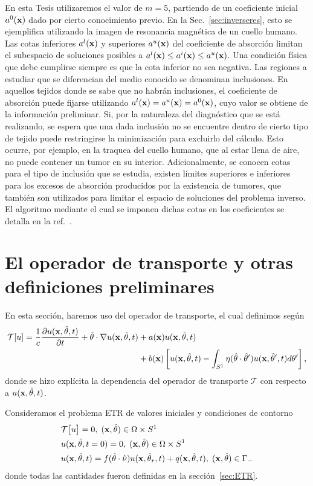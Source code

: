 En esta Tesis utilizaremos el valor 
de $m=5$, partiendo de un coeficiente inicial $a^0(\mathbf{x})$ dado 
por cierto conocimiento previo. En la Sec.~\ref{sec:inverseres}, esto se ejemplifica utilizando la imagen 
de resonancia magnética de un cuello humano.
Las cotas inferiores $a^l(\mathbf{x})$ y superiores $a^u(\mathbf{x})$ del coeficiente de absorción 
limitan el subespacio de soluciones posibles a $a^l(\mathbf{x})\leq a^i(\mathbf{x}) \leq a^u(\mathbf{x})$. 
Una condición física que debe cumplirse siempre es que la cota inferior 
no sea negativa. Las regiones a estudiar que se diferencian del medio 
conocido se denominan inclusiones. En aquellos tejidos donde se sabe 
que no habrán inclusiones, el coeficiente de absorción 
puede fijarse utilizando $a^l(\mathbf{x}) = a^u(\mathbf{x})=a^0(\mathbf{x})$, cuyo valor se obtiene de la información preliminar. Si, por la naturaleza del diagnóstico que se está realizando, 
se espera que una dada inclusión no 
se encuentre dentro de cierto tipo de tejido 
puede restringirse la minimización para excluirlo 
del cálculo. 
Esto ocurre, por ejemplo, en la traquea del cuello humano, que 
al estar llena de aire, no puede contener 
un tumor en su interior.
Adicionalmente, se conocen cotas para el tipo de inclusión 
que se estudia, \eg existen límites superiores e inferiores para los 
excesos de absorción producidos por la existencia de tumores, 
que también son utilizados para limitar el espacio de soluciones 
del problema inverso. 
El algoritmo mediante el cual se imponen dichas cotas en los coeficientes 
se detalla en la ref.~\cite{Byrd1995}. 

\section{El operador de transporte y otras definiciones preliminares}
En esta sección, haremos uso del operador de transporte, el cual definimos
según
\begin{equation}
\begin{split}
\mathcal{T}[u]=\frac{1}
{c}\frac{\partial u(\mathbf{x},\hat{\theta},t)}{\partial t} + \hat{\theta} \cdot \nabla u(\mathbf{x},\hat{\theta},t)&+a(\mathbf{x})u(\mathbf{x},\hat{\theta},t)\\
&+b(\mathbf{x})\left[u(\mathbf{x},\hat{\theta},t) - \int_{S^1}\eta(\hat{\theta}\cdot\hat{\theta} ') u(\mathbf{x},\hat{\theta}',t) d\theta'\right],
\end{split}
\label{eq:Toper}
\end{equation}
donde se hizo explícita la dependencia del operador de transporte $\mathcal{T}$ 
con respecto a $u(\mathbf{x},\hat{\theta},t)$. 

Consideramos el problema ETR de valores iniciales y condiciones 
de contorno
\begin{equation}
\begin{split}
\begin{aligned}
&\mathcal{T}\big[u\big]=0, \;  (\mathbf{x},\hat{\theta})  \in \Omega\times S^1\\
&u(\mathbf{x},\hat{\theta},t=0)=0, \;  (\mathbf{x},\hat{\theta})  \in \Omega\times S^1 \\
&u(\mathbf{x},\hat{\theta},t)=f(\hat{\theta} \cdot \hat{\nu}) u(\mathbf{x},\hat{\theta}_r,t) + q(\mathbf{x},\hat{\theta},t) , \; (\mathbf{x},\hat{\theta}) \in \Gamma_-
\end{aligned}
\end{split}
\label{eq:RTEt}
\end{equation}
donde todas las cantidades fueron definidas en la sección~\ref{sec:ETR}.


